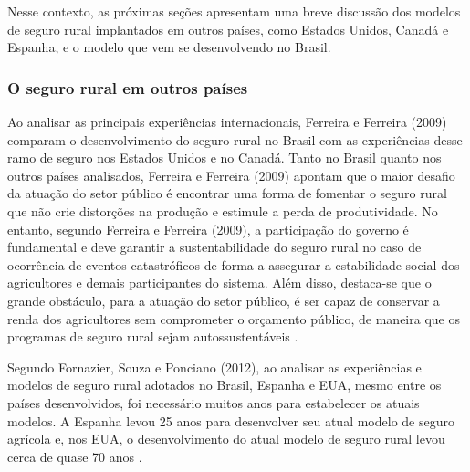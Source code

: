 \documentclass[12pt,a4paper]{article}
\begin{document}
Nesse contexto, as próximas seções apresentam uma breve discussão dos modelos de seguro rural implantados em outros países, como Estados Unidos, Canadá e Espanha, e o modelo que vem se  desenvolvendo no Brasil.


\subsubsection{O seguro rural em outros países}

Ao analisar as principais experiências internacionais, Ferreira e Ferreira (2009) comparam o desenvolvimento do seguro rural no Brasil com as experiências desse ramo de seguro nos Estados Unidos e no Canadá. Tanto no Brasil quanto nos outros países analisados, Ferreira e Ferreira (2009) apontam que o maior desafio da atuação do setor público é encontrar uma forma de fomentar o seguro rural que não crie distorções na produção e estimule a perda de produtividade. No entanto, segundo Ferreira e Ferreira (2009), a participação do governo é fundamental e deve garantir a sustentabilidade do seguro rural no caso de ocorrência de eventos catastróficos de forma a assegurar a estabilidade social dos agricultores e demais participantes do sistema. Além disso, destaca-se que o grande obstáculo, para a atuação do setor público, é ser capaz de conservar a renda dos agricultores sem comprometer o orçamento público, de maneira que os programas de seguro rural sejam autossustentáveis \cite{ferreira09_g}.  

Segundo Fornazier, Souza e Ponciano (2012), ao analisar as experiências e modelos de seguro rural adotados no Brasil, Espanha e EUA, mesmo entre os países desenvolvidos, foi necessário muitos anos para estabelecer os atuais modelos. A Espanha levou 25 anos para desenvolver seu atual modelo de seguro agrícola e, nos EUA, o desenvolvimento do atual modelo de seguro rural levou cerca de quase 70 anos \cite{ozaki06_g}.

\end{document}
